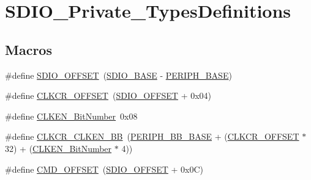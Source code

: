 \hypertarget{group___s_d_i_o___private___types_definitions}{}\section{S\+D\+I\+O\+\_\+\+Private\+\_\+\+Types\+Definitions}
\label{group___s_d_i_o___private___types_definitions}
\subsection*{Macros}
\begin{DoxyCompactItemize}
\item 
\#define \mbox{\hyperlink{group___s_d_i_o___private___types_definitions_gabf07aced03df5f46d57cea1d4f56d1e3}{S\+D\+I\+O\+\_\+\+O\+F\+F\+S\+ET}}~(\mbox{\hyperlink{group___peripheral__memory__map_ga95dd0abbc6767893b4b02935fa846f52}{S\+D\+I\+O\+\_\+\+B\+A\+SE}} -\/ \mbox{\hyperlink{group___peripheral__memory__map_ga9171f49478fa86d932f89e78e73b88b0}{P\+E\+R\+I\+P\+H\+\_\+\+B\+A\+SE}})
\item 
\#define \mbox{\hyperlink{group___s_d_i_o___private___types_definitions_gac5d642be874338519fdec175204ca8ed}{C\+L\+K\+C\+R\+\_\+\+O\+F\+F\+S\+ET}}~(\mbox{\hyperlink{group___s_d_i_o___private___types_definitions_gabf07aced03df5f46d57cea1d4f56d1e3}{S\+D\+I\+O\+\_\+\+O\+F\+F\+S\+ET}} + 0x04)
\item 
\#define \mbox{\hyperlink{group___s_d_i_o___private___types_definitions_ga6ad1da47f9d84c54eb620b9231ebec86}{C\+L\+K\+E\+N\+\_\+\+Bit\+Number}}~0x08
\item 
\#define \mbox{\hyperlink{group___s_d_i_o___private___types_definitions_gabfb5772b9b734972b576309f7ca8bf92}{C\+L\+K\+C\+R\+\_\+\+C\+L\+K\+E\+N\+\_\+\+BB}}~(\mbox{\hyperlink{group___peripheral__memory__map_gaed7efc100877000845c236ccdc9e144a}{P\+E\+R\+I\+P\+H\+\_\+\+B\+B\+\_\+\+B\+A\+SE}} + (\mbox{\hyperlink{group___s_d_i_o___private___types_definitions_gac5d642be874338519fdec175204ca8ed}{C\+L\+K\+C\+R\+\_\+\+O\+F\+F\+S\+ET}} $\ast$ 32) + (\mbox{\hyperlink{group___s_d_i_o___private___types_definitions_ga6ad1da47f9d84c54eb620b9231ebec86}{C\+L\+K\+E\+N\+\_\+\+Bit\+Number}} $\ast$ 4))
\item 
\#define \mbox{\hyperlink{group___s_d_i_o___private___types_definitions_gaf12d26702ce7a88d2a3dae87f000b75e}{C\+M\+D\+\_\+\+O\+F\+F\+S\+ET}}~(\mbox{\hyperlink{group___s_d_i_o___private___types_definitions_gabf07aced03df5f46d57cea1d4f56d1e3}{S\+D\+I\+O\+\_\+\+O\+F\+F\+S\+ET}} + 0x0\+C)
\item 

\end{DoxyCompactItemize}
